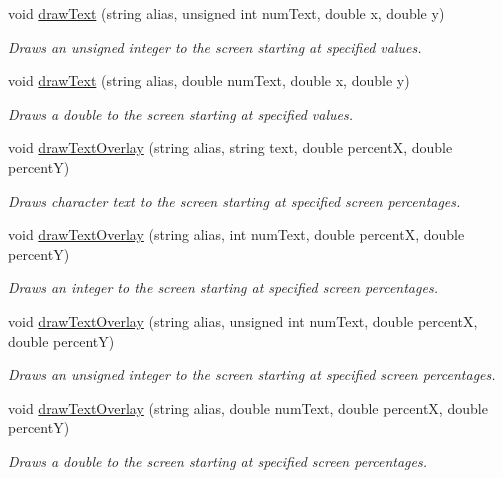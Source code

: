 \begin{CompactItemize}
void \hyperlink{class_resource_mgr_d326c9c69e0f7128ced33c5544b31708}{drawText} (string alias, unsigned int numText, double x, double y)
\begin{CompactList}\small\item\em Draws an unsigned integer to the screen starting at specified values. \item\end{CompactList}\item 
void \hyperlink{class_resource_mgr_6859acf90546fb86276d6e680fdeae1a}{drawText} (string alias, double numText, double x, double y)
\begin{CompactList}\small\item\em Draws a double to the screen starting at specified values. \item\end{CompactList}\item 
void \hyperlink{class_resource_mgr_cc2c71fee0d3218a25c1b5fceb6dca46}{drawTextOverlay} (string alias, string text, double percentX, double percentY)
\begin{CompactList}\small\item\em Draws character text to the screen starting at specified screen percentages. \item\end{CompactList}\item 
void \hyperlink{class_resource_mgr_45f157d11c70e86e4334b4378e1b8ac6}{drawTextOverlay} (string alias, int numText, double percentX, double percentY)
\begin{CompactList}\small\item\em Draws an integer to the screen starting at specified screen percentages. \item\end{CompactList}\item 
void \hyperlink{class_resource_mgr_180e76776a6818756cfacb4fe0c2e430}{drawTextOverlay} (string alias, unsigned int numText, double percentX, double percentY)
\begin{CompactList}\small\item\em Draws an unsigned integer to the screen starting at specified screen percentages. \item\end{CompactList}\item 
void \hyperlink{class_resource_mgr_2be88222637af2030e608e397cfdd89b}{drawTextOverlay} (string alias, double numText, double percentX, double percentY)
\begin{CompactList}\small\item\em Draws a double to the screen starting at specified screen percentages. \item\end{CompactList}\item 

\end{CompactItemize}
